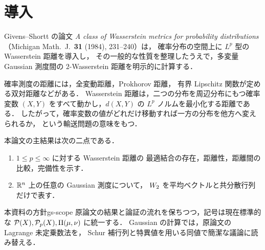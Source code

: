 \chapter{導入}
\label{ch:introduction}

Givens--Shortt の論文
\emph{A class of Wasserstein metrics for probability distributions}
（Michigan Math.\ J.\ \textbf{31} (1984), 231--240）は，
確率分布の空間上に $L^p$ 型の Wasserstein 距離を導入し，
その一般的な性質を整理したうえで，多変量 Gaussian 測度間の
$2$-Wasserstein 距離を明示的に計算する．

確率測度の距離には，全変動距離，Prokhorov 距離，
有界 Lipschitz 関数が定める双対距離などがある．
Wasserstein 距離は，二つの分布を周辺分布にもつ確率変数
$(X,Y)$ をすべて動かし，$d(X,Y)$ の $L^p$ ノルムを最小化する距離である．
したがって，確率変数の値がどれだけ移動すれば一方の分布を他方へ変えられるか，
という輸送問題の意味をもつ．

本論文の主結果は次の二点である．
\begin{enumerate}
  \item $1\leq p\leq\infty$ に対する Wasserstein 距離の
    最適結合の存在，距離性，距離間の比較，完備性を示す．
  \item $\mathbb{R}^n$ 上の任意の Gaussian 測度について，
    $W_2$ を平均ベクトルと共分散行列だけで表す．
\end{enumerate}

\begin{remark}{本資料の方針}{gs-scope}
  原論文の結果と論証の流れを保ちつつ，記号は現在標準的な
  $\mathcal{P}(X),\mathcal{P}_{p}(X),\Pi(\mu,\nu)$ に統一する．
  Gaussian の計算では，原論文の Lagrange 未定乗数法を，
  Schur 補行列と特異値を用いる同値で簡潔な議論に読み替える．
\end{remark}
